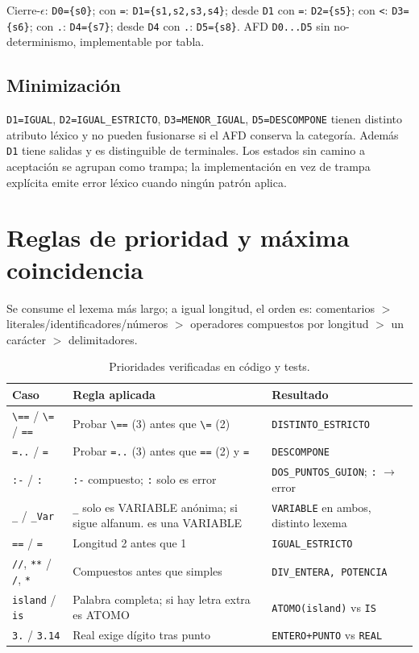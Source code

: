 \documentclass[12pt,a4paper]{article}
\begin{document}
Cierre-$\epsilon$: \texttt{D0=\{s0\}}; con \texttt{=}: \texttt{D1=\{s1,s2,s3,s4\}}; desde \texttt{D1} con \texttt{=}: \texttt{D2=\{s5\}}; con \texttt{<}: \texttt{D3=\{s6\}}; con \texttt{.}: \texttt{D4=\{s7\}}; desde \texttt{D4} con \texttt{.}: \texttt{D5=\{s8\}}. AFD \texttt{D0...D5} sin no-determinismo, implementable por tabla.

\subsection{Minimización}
\texttt{D1=IGUAL}, \texttt{D2=IGUAL\_ESTRICTO}, \texttt{D3=MENOR\_IGUAL}, \texttt{D5=DESCOMPONE} tienen distinto atributo léxico y no pueden fusionarse si el AFD conserva la categoría. Además \texttt{D1} tiene salidas y es distinguible de terminales. Los estados sin camino a aceptación se agrupan como trampa; la implementación en vez de trampa explícita emite error léxico cuando ningún patrón aplica.

\section{Reglas de prioridad y máxima coincidencia}
Se consume el lexema más largo; a igual longitud, el orden es: comentarios $>$ literales/identificadores/números $>$ operadores compuestos por longitud $>$ un carácter $>$ delimitadores.

\begin{table}[H]
\centering
{\small\setlength{\tabcolsep}{3pt}
\begin{tabular}{|p{3.2cm}|p{6.5cm}|p{4.5cm}|}
\hline
\textbf{Caso} & \textbf{Regla aplicada} & \textbf{Resultado} \\ \hline
\texttt{\textbackslash==} / \texttt{\textbackslash=} / \texttt{==} & Probar \texttt{\textbackslash==} (3) antes que \texttt{\textbackslash=} (2) & \texttt{DISTINTO\_ESTRICTO} \\ \hline
\texttt{=..} / \texttt{=} & Probar \texttt{=..} (3) antes que \texttt{==} (2) y \texttt{=} & \texttt{DESCOMPONE} \\ \hline
\texttt{:-} / \texttt{:} & \texttt{:-} compuesto; \texttt{:} solo es error & \texttt{DOS\_PUNTOS\_GUION}; \texttt{:} $\rightarrow$ error \\ \hline
\texttt{\_} / \texttt{\_Var} & \texttt{\_} solo es VARIABLE anónima; si sigue alfanum. es una VARIABLE & \texttt{VARIABLE} en ambos, distinto lexema \\ \hline
\texttt{==} / \texttt{=} & Longitud 2 antes que 1 & \texttt{IGUAL\_ESTRICTO} \\ \hline
\texttt{//}, \texttt{**} / \texttt{/}, \texttt{*} & Compuestos antes que simples & \texttt{DIV\_ENTERA, POTENCIA} \\ \hline
\texttt{island} / \texttt{is} & Palabra completa; si hay letra extra es ATOMO & \texttt{ATOMO(island)} vs \texttt{IS} \\ \hline
\texttt{3.} / \texttt{3.14} & Real exige dígito tras punto & \texttt{ENTERO+PUNTO} vs \texttt{REAL} \\ \hline
\end{tabular}
}
\caption{Prioridades verificadas en código y tests.}
\end{table}
\end{document}
